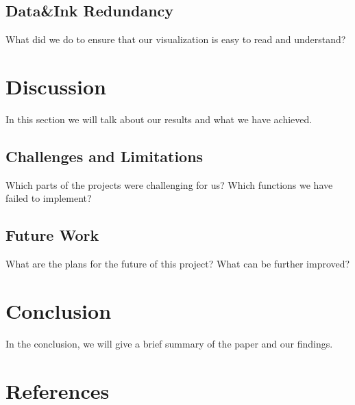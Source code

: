 \documentclass[journal]{vgtc}                %
\begin{document}
	\subsection{Data\&Ink Redundancy}
	
	What did we do to ensure that our visualization is easy to read and understand?

\section{Discussion}

In this section we will talk about our results and what we have achieved.

	\subsection{Challenges and Limitations}
	
	Which parts of the projects were challenging for us? Which functions we have failed to implement?
	
	\subsection{Future Work}
	
	What are the plans for the future of this project? What can be further improved?

\section{Conclusion}

In the conclusion, we will give a brief summary of the paper and our findings.

\section{References}




%

%
%
%


\end{document}
